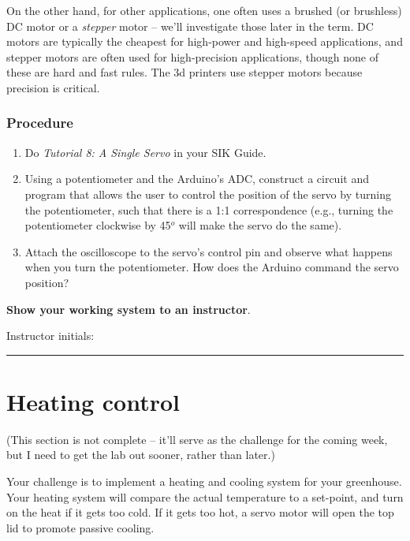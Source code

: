 \documentclass[11pt]{article} %
\begin{document}
On the other hand, for other applications, one often uses a brushed (or brushless) DC motor or a \emph{stepper} motor -- we'll investigate those later in the term. DC motors are typically the cheapest for high-power and high-speed applications, and stepper motors are often used for high-precision applications, though none of these are hard and fast rules. The 3d printers use stepper motors because precision is critical. 

\subsubsection*{Procedure}

\begin{enumerate}
\item Do \emph{Tutorial 8: A Single Servo} in your SIK Guide.
\item Using a potentiometer and the Arduino’s ADC, construct a circuit and program that allows the user to control the position of the servo by turning the potentiometer, such that there is a 1:1 correspondence (e.g., turning the potentiometer clockwise by 45$^o$ will make the servo do the same).
\item Attach the oscilloscope to the servo’s control pin and observe what happens when you turn the potentiometer. How does the Arduino command the servo position?
\end{enumerate}

{\bf Show your working system to an instructor}.

\vspace{0.25in}
Instructor initials: \rule{2in}{0.4pt}
\vspace{0.25in}

\section*{Heating control}

(This section is not complete -- it’ll serve as the challenge for the coming week, but I need to get the lab out sooner, rather than later.)

Your challenge is to implement a heating and cooling system for your greenhouse. Your heating system will compare the actual temperature to a set-point, and turn on the heat if it gets too cold. If it gets too hot, a servo motor will open the top lid to promote passive cooling.
\end{document}
